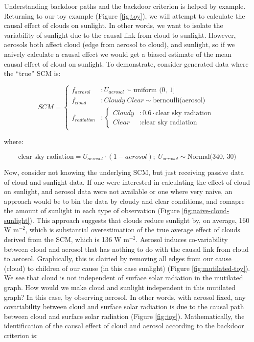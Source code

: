 \documentclass[12pt]{article}
\begin{document}
Understanding backdoor paths and the backdoor criterion is helped by
example. Returning to our toy example (Figure \ref{fig:toy}), we will
attempt to calculate the causal effect of clouds on sunlight. In other
words, we want to isolate the variability of sunlight due to the
causal link from cloud to sunlight. However, aerosols both affect
cloud (edge from aerosol to cloud), and sunlight, so if we naively
calculate a causal effect we would get a biased estimate of the mean
causal effect of cloud on sunlight. To demonstrate, consider generated
data where the ``true'' SCM is:

\begin{equation}
  SCM =
  \begin{cases}
    f_{aerosol} &: U_{aerosol} \sim \text{uniform (0, 1]}\\
    f_{cloud} &: Cloudy | Clear \sim \text{bernoulli(aerosol)}     \\
    f_{radiation} &: \begin{cases}
      Cloudy &: 0.6 \cdot \text{clear sky radiation}  \\
      Clear &: \text{clear sky radiation}
    \end{cases}
  \end{cases}
\end{equation}

where:

\begin{equation*}
  \text{clear sky radiation} = U_{aerosol} \cdot (1 - aerosol); \;
  U_{aerosol} \sim \text{Normal(340, 30)}
\end{equation*}

Now, consider not knowing the underlying SCM, but just receiving
passive data of cloud and sunlight data. If one were interested in
calculating the effect of cloud on sunlight, and aerosol data were not
available or one where very naive, an approach would be to bin the
data by cloudy and clear conditions, and comapre the amount of
sunlight in each type of observation (Figure
\ref{fig:naive-cloud-sunlight}). This approach suggests that clouds
reduce sunlight by, on average, 160 W m$^{-2}$, which is substantial
overestimation of the true average effect of clouds derived from the
SCM, which is 136 W m$^{-2}$. Aerosol induces co-variability between
cloud and aerosol that has nothing to do with the causal link from
cloud to aerosol. Graphically, this is clairied by removing all edges
from our cause (cloud) to children of our cause (in this case
sunlight) (Figure \ref{fig:mutilated-toy}). We see that cloud is not
independent of surface solar radiation in the mutilated graph.  How
would we make cloud and sunlight independent in this mutilated graph?
In this case, by observing aerosol. In other words, with aerosol
fixed, any covariability between cloud and surface solar radiation is
due to the causal path between cloud and surface solar radiation
(Figure \ref{fig:toy}).  Mathematically, the identification of the
causal effect of cloud and aerosol according to the backdoor criterion
is:
\end{document}
